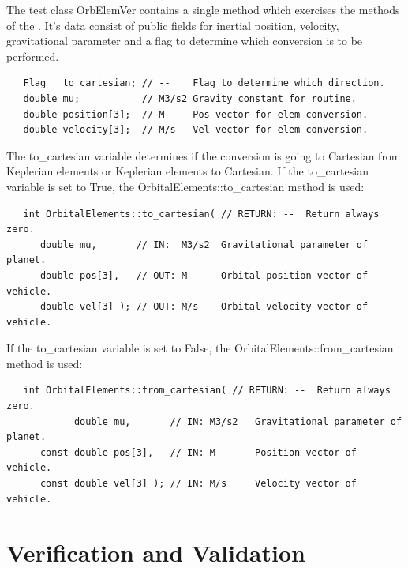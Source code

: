 The test class OrbElemVer contains a single method which exercises the methods of the \OrbitalElement.  It's data consist of public fields for inertial position, velocity, gravitational parameter and a flag to determine which conversion is to be performed.
\begin{verbatim}
   Flag   to_cartesian; // --    Flag to determine which direction.
   double mu;           // M3/s2 Gravity constant for routine.
   double position[3];  // M     Pos vector for elem conversion.
   double velocity[3];  // M/s   Vel vector for elem conversion.
\end{verbatim}

The to\_cartesian variable determines if the conversion is going to
Cartesian from Keplerian elements or Keplerian elements to Cartesian.
If the to\_cartesian variable is set to True, the
OrbitalElements::to\_cartesian method is used:
\begin{verbatim}
   int OrbitalElements::to_cartesian( // RETURN: --  Return always zero.
      double mu,       // IN:  M3/s2  Gravitational parameter of planet.
      double pos[3],   // OUT: M      Orbital position vector of vehicle.
      double vel[3] ); // OUT: M/s    Orbital velocity vector of vehicle.
\end{verbatim}

If the to\_cartesian variable is set to False, the
OrbitalElements::from\_cartesian method is used:
\begin{verbatim}
   int OrbitalElements::from_cartesian( // RETURN: --  Return always zero.
            double mu,       // IN: M3/s2   Gravitational parameter of planet.
      const double pos[3],   // IN: M       Position vector of vehicle.
      const double vel[3] ); // IN: M/s     Velocity vector of vehicle.
\end{verbatim}





\chapter{Verification and Validation}\label{ch:ivv}

